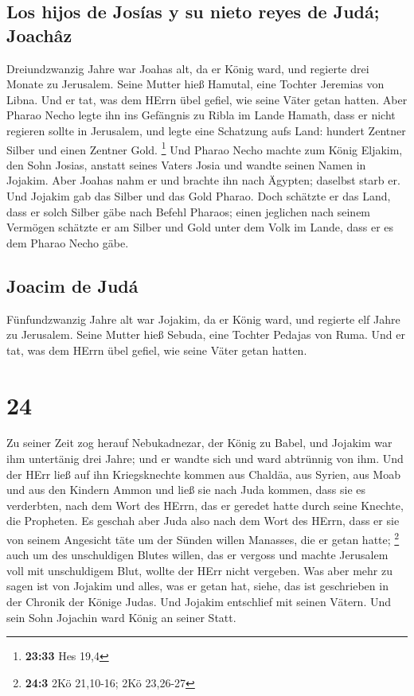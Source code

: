 \hypertarget{los-hijos-de-josuxedas-y-su-nieto-reyes-de-juduxe1-joachuxe2z}{%
\subsection{Los hijos de Josías y su nieto reyes de Judá;
Joachâz}\label{los-hijos-de-josuxedas-y-su-nieto-reyes-de-juduxe1-joachuxe2z}}

 Dreiundzwanzig Jahre war Joahas alt, da er König ward,
und regierte drei Monate zu Jerusalem. Seine Mutter hieß Hamutal, eine
Tochter Jeremias von Libna.  Und er tat, was dem HErrn
übel gefiel, wie seine Väter getan hatten.  Aber Pharao
Necho legte ihn ins Gefängnis zu Ribla im Lande Hamath, dass er nicht
regieren sollte in Jerusalem, und legte eine Schatzung aufs Land:
hundert Zentner Silber und einen Zentner Gold. \footnote{\textbf{23:33}
  Hes 19,4}  Und Pharao Necho machte zum König Eljakim,
den Sohn Josias, anstatt seines Vaters Josia und wandte seinen Namen in
Jojakim. Aber Joahas nahm er und brachte ihn nach Ägypten; daselbst
starb er.  Und Jojakim gab das Silber und das Gold
Pharao. Doch schätzte er das Land, dass er solch Silber gäbe nach Befehl
Pharaos; einen jeglichen nach seinem Vermögen schätzte er am Silber und
Gold unter dem Volk im Lande, dass er es dem Pharao Necho gäbe.

\hypertarget{joacim-de-juduxe1}{%
\subsection{Joacim de Judá}\label{joacim-de-juduxe1}}

 Fünfundzwanzig Jahre alt war Jojakim, da er König ward,
und regierte elf Jahre zu Jerusalem. Seine Mutter hieß Sebuda, eine
Tochter Pedajas von Ruma.  Und er tat, was dem HErrn übel
gefiel, wie seine Väter getan hatten.

\hypertarget{section-23}{%
\section{24}\label{section-23}}

 Zu seiner Zeit zog herauf Nebukadnezar, der König zu
Babel, und Jojakim war ihm untertänig drei Jahre; und er wandte sich und
ward abtrünnig von ihm.  Und der HErr ließ auf ihn
Kriegsknechte kommen aus Chaldäa, aus Syrien, aus Moab und aus den
Kindern Ammon und ließ sie nach Juda kommen, dass sie es verderbten,
nach dem Wort des HErrn, das er geredet hatte durch seine Knechte, die
Propheten.  Es geschah aber Juda also nach dem Wort des
HErrn, dass er sie von seinem Angesicht täte um der Sünden willen
Manasses, die er getan hatte; \footnote{\textbf{24:3} 2Kö 21,10-16; 2Kö
  23,26-27}  auch um des unschuldigen Blutes willen, das
er vergoss und machte Jerusalem voll mit unschuldigem Blut, wollte der
HErr nicht vergeben.  Was aber mehr zu sagen ist von
Jojakim und alles, was er getan hat, siehe, das ist geschrieben in der
Chronik der Könige Judas.  Und Jojakim entschlief mit
seinen Vätern. Und sein Sohn Jojachin ward König an seiner Statt.

